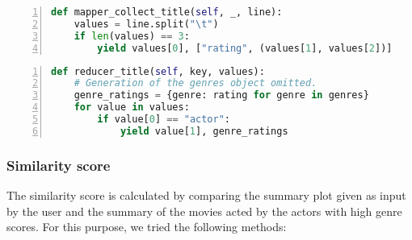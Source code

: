 \begin{lstlisting}[float=h, language=Python, caption=Genre score mapper, label=GenreScoreCode1, numbers=left]
def mapper_collect_title(self, _, line):
    values = line.split("\t")
    if len(values) == 3:
        yield values[0], ["rating", (values[1], values[2])]
\end{lstlisting}



\begin{lstlisting}[float=h, language=Python, caption=Genre score first reducer, label=GenreScoreCode2, numbers=left]
def reducer_title(self, key, values):
    # Generation of the genres object omitted.
    genre_ratings = {genre: rating for genre in genres}
    for value in values:
        if value[0] == "actor":
            yield value[1], genre_ratings
\end{lstlisting}



\subsubsection{Similarity score}
The similarity score is calculated by comparing the summary plot given as input by the user and the summary of the movies acted by the actors with high genre scores. For this purpose, we tried the following methods:

